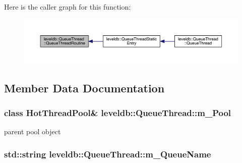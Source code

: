 Here is the caller graph for this function\+:\nopagebreak
\begin{figure}[H]
\begin{center}
\leavevmode
\includegraphics[width=350pt]{structleveldb_1_1_queue_thread_a4ff595ae14d6502e080621be96cd30a9_icgraph}
\end{center}
\end{figure}




\subsection{Member Data Documentation}
\hypertarget{structleveldb_1_1_queue_thread_a7e5f6e3e8b24a4698b775dcd9caa9726}{}
\subsubsection[{m\+\_\+\+Pool}]{\setlength{\rightskip}{0pt plus 5cm}class {\bf Hot\+Thread\+Pool}\& leveldb\+::\+Queue\+Thread\+::m\+\_\+\+Pool}\label{structleveldb_1_1_queue_thread_a7e5f6e3e8b24a4698b775dcd9caa9726}


parent pool object 

\hypertarget{structleveldb_1_1_queue_thread_ad232678ff8b15ad8be50cb5a0e68fa07}{}
\subsubsection[{m\+\_\+\+Queue\+Name}]{\setlength{\rightskip}{0pt plus 5cm}std\+::string leveldb\+::\+Queue\+Thread\+::m\+\_\+\+Queue\+Name}\label{structleveldb_1_1_queue_thread_ad232678ff8b15ad8be50cb5a0e68fa07}
\hypertarget{structleveldb_1_1_queue_thread_a697f7c0aaeb5e776cf1de59476ec2005}{}
